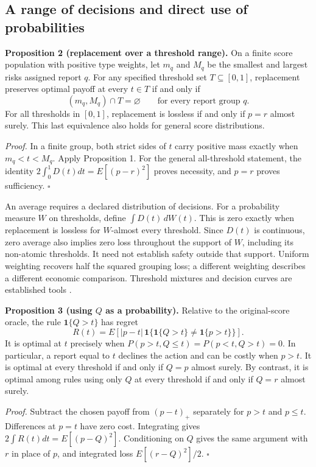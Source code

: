\clearpage
\subsection{A range of decisions and direct use of probabilities}
\textbf{Proposition 2 (replacement over a threshold range).} On a finite score population with positive type weights, let $m_q$ and $M_q$ be the smallest and largest risks assigned report $q$. For any specified threshold set $T\subseteq[0,1]$, replacement preserves optimal payoff at every $t\in T$ if and only if
\[
(m_q,M_q)\cap T=\varnothing\qquad\text{for every report group }q.
\]
For all thresholds in $[0,1]$, replacement is lossless if and only if $p=r$ almost surely. This last equivalence also holds for general score distributions.

\emph{Proof.} In a finite group, both strict sides of $t$ carry positive mass exactly when $m_q<t<M_q$. Apply Proposition 1. For the general all-threshold statement, the identity $2\int_0^1D(t)dt=E[(p-r)^2]$ proves necessity, and $p=r$ proves sufficiency. \hfill$\square$

An average requires a declared distribution of decisions. For a probability measure $W$ on thresholds, define $\int D(t)\,dW(t)$. This is zero exactly when replacement is lossless for $W$-almost every threshold. Since $D(t)$ is continuous, zero average also implies zero loss throughout the support of $W$, including its non-atomic thresholds. It need not establish safety outside that support. Uniform weighting recovers half the squared grouping loss; a different weighting describes a different economic comparison. Threshold mixtures and decision curves are established tools \citep{ehm,vickers2006}.

\textbf{Proposition 3 (using $Q$ as a probability).} Relative to the original-score oracle, the rule $\mathbf1\{Q>t\}$ has regret
\[
R(t)=E\left[|p-t|\,\mathbf1\{\mathbf1\{Q>t\}\ne\mathbf1\{p>t\}\}\right].
\]
It is optimal at $t$ precisely when $P(p>t,Q\leq t)=P(p<t,Q>t)=0$. In particular, a report equal to $t$ declines the action and can be costly when $p>t$. It is optimal at every threshold if and only if $Q=p$ almost surely. By contrast, it is optimal among rules using only $Q$ at every threshold if and only if $Q=r$ almost surely.

\emph{Proof.} Subtract the chosen payoff from $(p-t)_+$ separately for $p>t$ and $p\leq t$. Differences at $p=t$ have zero cost. Integrating gives $2\int R(t)dt=E[(p-Q)^2]$. Conditioning on $Q$ gives the same argument with $r$ in place of $p$, and integrated loss $E[(r-Q)^2]/2$. \hfill$\square$

